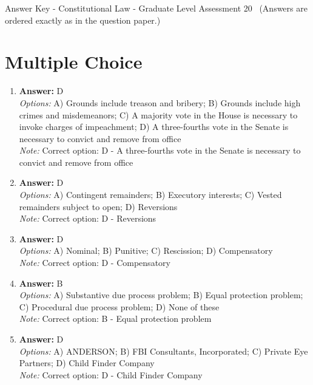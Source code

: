 \documentclass[12pt]{article}
\begin{document}
\begin{center}
Answer Key - Constitutional Law - Graduate Level Assessment 20 \
\small (Answers are ordered exactly as in the question paper.)
\end{center}

\section*{Multiple Choice}
\begin{enumerate}[label=\arabic*.]
\item \textbf{Answer:} D
\\ \textit{Options:} A) Grounds include treason and bribery; B) Grounds include high crimes and misdemeanors; C) A majority vote in the House is necessary to invoke charges of impeachment; D) A three-fourths vote in the Senate is necessary to convict and remove from office
\\ \textit{Note:} Correct option: D - A three-fourths vote in the Senate is necessary to convict and remove from office
\item \textbf{Answer:} D
\\ \textit{Options:} A) Contingent remainders; B) Executory interests; C) Vested remainders subject to open; D) Reversions
\\ \textit{Note:} Correct option: D - Reversions
\item \textbf{Answer:} D
\\ \textit{Options:} A) Nominal; B) Punitive; C) Rescission; D) Compensatory
\\ \textit{Note:} Correct option: D - Compensatory
\item \textbf{Answer:} B
\\ \textit{Options:} A) Substantive due process problem; B) Equal protection problem; C) Procedural due process problem; D) None of these
\\ \textit{Note:} Correct option: B - Equal protection problem
\item \textbf{Answer:} D
\\ \textit{Options:} A) ANDERSON; B) FBI Consultants, Incorporated; C) Private Eye Partners; D) Child Finder Company
\\ \textit{Note:} Correct option: D - Child Finder Company
\end{enumerate}
\end{document}
